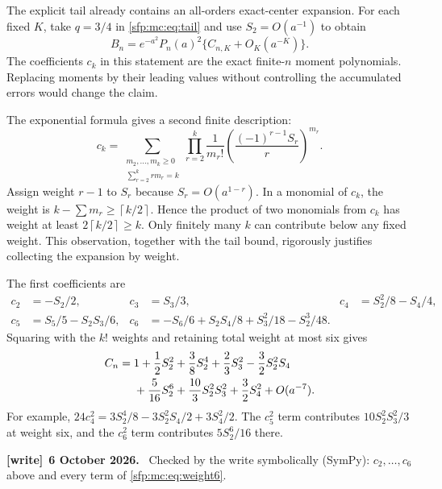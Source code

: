 \documentclass[11pt,letterpaper]{article}
\numberwithin{equation}{section}
\theoremstyle{definition}\newtheorem{definition}[theorem]{Definition}
\theoremstyle{remark}\newtheorem{remark}[theorem]{Remark}
\newcommand{\ceil}[1]{\left\lceil #1\right\rceil}
\newenvironment{writenote}[1][]{\par\smallskip\begingroup\small
 \noindent\textbf{[write]}\if\relax\detokenize{#1}\relax\else~\textbf{#1.}\fi\ }%
 {\par\endgroup\smallskip}
\begin{document}
The explicit tail already contains an all-orders exact-center
expansion. For each fixed $K$, take $q=3/4$ in \eqref{sfp:mc:eq:tail}
and use $S_2=O(a^{-1})$ to obtain
\begin{equation}\label{sfp:mc:eq:centerasymptotic}
 B_n=e^{-a^2}P_n(a)^2\{C_{n,K}+O_K(a^{-K})\}.
\end{equation}
The coefficients $c_k$ in this statement are the exact finite-$n$
moment polynomials. Replacing moments by their leading values
without controlling the accumulated errors would change the claim.

The exponential formula gives a second finite description:
\begin{equation}\label{sfp:mc:eq:partitioncoeff}
 c_k=\sum_{\substack{m_2,\ldots,m_k\geq0\\
                    \sum_{r=2}^{k}r m_r=k}}
       \prod_{r=2}^{k}\frac1{m_r!}
       \left(\frac{(-1)^{r-1}S_r}{r}\right)^{m_r}.
\end{equation}
Assign weight $r-1$ to $S_r$ because $S_r=O(a^{1-r})$.
In a monomial of $c_k$, the weight is
$k-\sum m_r\geq\ceil{k/2}$. Hence the product of two monomials
from $c_k$ has weight at least $2\ceil{k/2}\geq k$.
Only finitely many $k$ can contribute below any fixed weight.
This observation, together with the tail bound, rigorously justifies
collecting the expansion by weight.

The first coefficients are
\begin{align*}
 c_2&=-S_2/2,&
 c_3&=S_3/3,&
 c_4&=S_2^2/8-S_4/4,\\
 c_5&=S_5/5-S_2S_3/6,&
 c_6&=-S_6/6+S_2S_4/8+S_3^2/18-S_2^3/48.
\end{align*}
Squaring with the $k!$ weights and retaining total weight at most
six gives
\begin{align}
 C_n={}&1+\frac12S_2^2+\frac38S_2^4+\frac23S_3^2
       -\frac32S_2^2S_4 \notag\\
      &+\frac5{16}S_2^6+\frac{10}{3}S_2^2S_3^2
       +\frac32S_4^2+O(a^{-7}).\label{sfp:mc:eq:weight6}
\end{align}
For example, $24c_4^2=3S_2^4/8-3S_2^2S_4/2+3S_4^2/2$.
The $c_5^2$ term contributes $10S_2^2S_3^2/3$ at weight six,
and the $c_6^2$ term contributes $5S_2^6/16$ there.
\begin{writenote}[6 October 2026]
Checked by the write symbolically (SymPy): $c_2,\dots,c_6$ above and every term of \eqref{sfp:mc:eq:weight6}.
\end{writenote}
\end{document}
